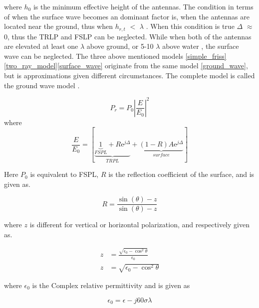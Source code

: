 where $h_0$ is the minimum effective height of the antennas. The condition in terms of when the surface wave becomes an dominant factor is, when the antennas are located near the ground, thus when $h_{r,t}$ $<$ $\lambda$ \cite{Chong}. When this condition is true $\Delta$ $\approx$ 0, thus the TRLP and FSLP can be neglected.    
While when both of the antennas are elevated at least one $\lambda$ above ground, or 5-10 $\lambda$ above water \cite{Chong}, the surface wave can be neglected. 
The three above mentioned models \eqref{simple_friss}\eqref{two_ray_model}\eqref{surface_wave} originate from the same model \eqref{ground_wave}, but is approximations given different circumstances. The complete model is called the ground wave model \cite{Chong,Bullington}. %


\begin{equation}
P_r=P_0 \left|\frac{E}{E_0}\right|^2 
\label{ground_wave}
\end{equation}
where
\begin{equation}
\frac{E}{E_{0}}=[\underbrace{\underbrace{1}_{FSPL}+R\text{e}^{j\Delta}}_{TRPL}+\underbrace{(1-R)A\text{e}^{j\Delta}}_{surface}]
\label{ground_wave_EE0}
\end{equation}

Here $P_{0}$ is equivalent to FSPL, $R$ is the reflection coefficient of the surface, and is given as.

\begin{equation}
R = \frac{\sin(\theta)-z}{\sin(\theta)-z}
\end{equation}

where $z$ is different for vertical or horizontal polarization, and respectively given as.

\begin{align}
z &= \frac{\sqrt{\epsilon_{0}-\cos^{2}\theta}}{\epsilon_{0}} \\
z &= \sqrt{\epsilon_{0}-\cos^{2}\theta}
\end{align}

where $\epsilon_{0}$ is the Complex relative permittivity and is given as 

\begin{equation}
\epsilon_{0} = \epsilon-j60\sigma \lambda
\label{eps_0}
\end{equation}


